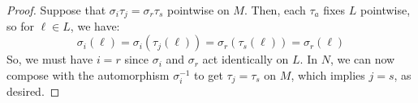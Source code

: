 \begin{proof}
    Suppose that $\sigma_i\tau_j = \sigma_r\tau_s$ pointwise on $M$. Then, each $\tau_a$ fixes $L$ pointwise, so for $\ell \in L$, we have:
    \[ \sigma_i(\ell) = \sigma_i(\tau_j(\ell)) = \sigma_r(\tau_s(\ell)) = \sigma_r(\ell) \]
    So, we must have $i = r$ since $\sigma_i$ and $\sigma_r$ act identically on $L$. In $N$, we can now compose with the automorphism $\sigma_i^{-1}$ to get $\tau_j = \tau_s$ on $M$, which implies $j = s$, as desired.
\end{proof}
